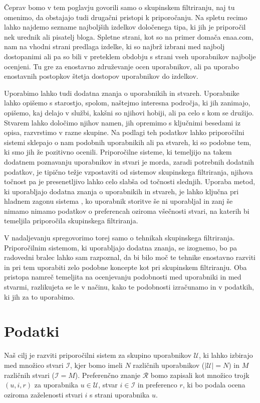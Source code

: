 Čeprav bomo v tem poglavju govorili samo o skupinskem filtriranju, naj
tu omenimo, da obstajajo tudi drugačni pristopi k priporočanju. Na
spletu recimo lahko najdemo sezname najboljših izdelkov določenega
tipa, ki jih je priporočil nek urednik ali pisatelj bloga. Spletne
strani, kot so na primer domača enaa.com, nam na vhodni strani
predlaga izdelke, ki so najbrž izbrani med najbolj dostopanimi ali pa
so bili v preteklem obdobju s strani vseh uporabnikov najbolje
ocenjeni. Tu gre za enostavno združevanje ocen uporabnikov, ali pa
uporabo enostavnih postopkov štetja dostopov uporabnikov do izdelkov.

Uporabimo lahko tudi dodatna znanja o uporabnikih in stvareh. Uporabnike lahko opišemo s starostjo, spolom, naštejmo interesna področja, ki jih zanimajo, opišemo, kaj delajo v službi, kakšni so njihovi hobiji, ali pa celo s kom se družijo. Stvarem lahko določimo njihov namen, jih opremimo s ključnimi besedami iz opisa, razvrstimo v razne skupine. Na podlagi teh podatkov lahko priporočilni sistemi sklepajo o nam podobnih uporabnikih ali pa stvareh, ki so podobne tem, ki smo jih že pozitivno ocenili. Priporočilne sisteme, ki temeljijo na takem dodatnem poznavanju uporabnikov in stvari  je morda, zaradi potrebnih dodatnih podatkov, je tipično težje vzpostaviti od sistemov skupinskega filtriranja, njihova točnost pa je presenetljivo lahko celo slabša od točnosti slednjih. Uporaba metod, ki uporabljajo dodatna znanja o uporabnikih in stvareh, je lahko ključna pri hladnem zagonu sistema , ko uporabnik storitve še ni uporabljal in zanj še nimamo nimamo podatkov o preferencah oziroma všečnosti stvari, na katerih bi temeljila priporočila skupinskega filtriranja.

V nadaljevanju spregovorimo torej samo o tehnikah skupinskega filtriranja. Priporočilnim sistemom, ki uporabljajo dodatna znanja, se izognemo, bo pa radovedni bralec lahko sam razpoznal, da bi bilo moč te tehnike enostavno razviti in pri tem uporabiti zelo podobne koncepte kot pri skupinskem filtriranju. Oba pristopa namreč temeljita na ocenjevanju podobnosti med uporabniki in med stvarmi, razlikujeta se le v načinu, kako te podobnosti izračunamo in v podatkih, ki jih za to uporabimo.

\section{Podatki}

Naš cilj je razviti priporočilni sistem za skupino uporabnikov $\mathcal{U}$, ki lahko izbirajo med množico stvari $\mathcal{I}$, kjer bomo imeli $N$ različnih uporabnikov ($|\mathcal{U}|=N$) in $M$ različnih stvari ($\mathcal{I}=M$). Preferenčno znanje $\mathcal{R}$ bomo zapisali kot množico trojk $(u,i,r)$ za uporabnika $u\in\mathcal{U}$, stvar $i\in\mathcal{I}$ in preferenco $r$, ki bo podala ocena oziroma zaželenosti stvari $i$ s strani uporabnika $u$.

